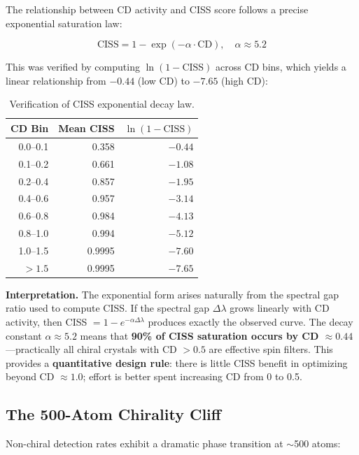\documentclass[11pt,a4paper]{article}
\begin{document}
The relationship between CD activity and CISS score follows a precise exponential saturation law:

\begin{equation}
\text{CISS} = 1 - \exp(-\alpha \cdot \text{CD}), \quad \alpha \approx 5.2
\label{eq:ciss_decay}
\end{equation}

\noindent This was verified by computing $\ln(1 - \text{CISS})$ across CD bins, which yields a linear relationship from $-0.44$ (low CD) to $-7.65$ (high CD):

\begin{table}[H]
\centering
\caption{Verification of CISS exponential decay law.}
\label{tab:ciss_decay}
\begin{tabular}{rrr}
\toprule
CD Bin & Mean CISS & $\ln(1 - \text{CISS})$ \\
\midrule
0.0--0.1 & 0.358 & $-0.44$ \\
0.1--0.2 & 0.661 & $-1.08$ \\
0.2--0.4 & 0.857 & $-1.95$ \\
0.4--0.6 & 0.957 & $-3.14$ \\
0.6--0.8 & 0.984 & $-4.13$ \\
0.8--1.0 & 0.994 & $-5.12$ \\
1.0--1.5 & 0.9995 & $-7.60$ \\
$>1.5$ & 0.9995 & $-7.65$ \\
\bottomrule
\end{tabular}
\end{table}

\noindent\textbf{Interpretation.} The exponential form arises naturally from the spectral gap ratio used to compute CISS. If the spectral gap $\Delta\lambda$ grows linearly with CD activity, then CISS $= 1 - e^{-\alpha\Delta\lambda}$ produces exactly the observed curve. The decay constant $\alpha \approx 5.2$ means that \textbf{90\% of CISS saturation occurs by CD $\approx 0.44$}---practically all chiral crystals with CD $> 0.5$ are effective spin filters. This provides a \textbf{quantitative design rule}: there is little CISS benefit in optimizing beyond CD $\approx 1.0$; effort is better spent increasing CD from 0 to 0.5.

\subsection{The 500-Atom Chirality Cliff}

Non-chiral detection rates exhibit a dramatic phase transition at $\sim$500 atoms:
\end{document}
